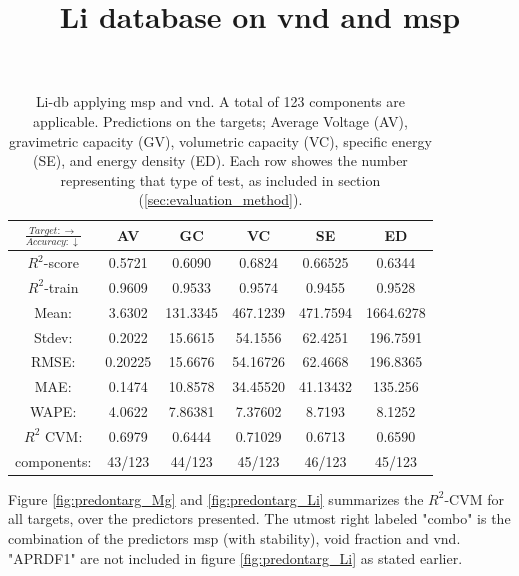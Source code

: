 \begin{table}[h]
\normalsize
\centering
\caption{Li-db applying msp and vnd. A total of 123 components are applicable. Predictions on the targets; Average Voltage (AV), gravimetric capacity (GV), volumetric capacity (VC), specific energy (SE), and energy density (ED). Each row showes the number representing that type of test, as included in section (\ref{sec:evaluation_method}).}
\title{Li database on vnd and msp}
\begin{tabular}{|c|c|c|c|c|c|}
	\hline 
	$\frac{Target: \rightarrow}{Accuracy:\downarrow} $ & AV & GC & VC & SE & ED 
	 \\ 
	\hline
	$R^2$-score 	& 0.5721 & 0.6090 & 0.6824 & 0.66525 &  0.6344\\ 
	\hline 
	$R^2$-train 	& 0.9609 & 0.9533 & 0.9574 & 0.9455 &  0.9528 \\ 
	\hline
	Mean: 	 	& 3.6302	&131.3345&467.1239& 471.7594& 1664.6278\\
	\hline 
	Stdev:	 	& 0.2022	&15.6615	&54.1556 	&62.4251	& 196.7591\\
	\hline 
	RMSE: 		&0.20225& 15.6676 &  54.16726 & 62.4668 &196.8365\\ 
	\hline
	MAE: 		& 0.1474 & 10.8578& 34.45520 & 41.13432 & 135.256 \\ 
	\hline
	WAPE: 		& 4.0622 & 7.86381 & 7.37602  & 8.7193 & 8.1252 \\
	\hline
	$R^2$ CVM: 	& 0.6979 	& 0.6444 	& 0.71029 & 0.6713 &0.6590 \\
	\hline
	components: 	& 43/123 	& 44/123 	& 45/123 	 & 46/123 	&45/123 \\
	\hline
\end{tabular}
\label{tab:Li-vnd-msp}
\end{table}

Figure \ref{fig:predontarg_Mg} and \ref{fig:predontarg_Li} summarizes the $R^2$-CVM for all targets, over the predictors presented. The utmost right labeled "combo" is the combination of the predictors msp (with stability), void fraction and vnd. "APRDF1" are not included in figure \ref{fig:predontarg_Li} as stated earlier. 


